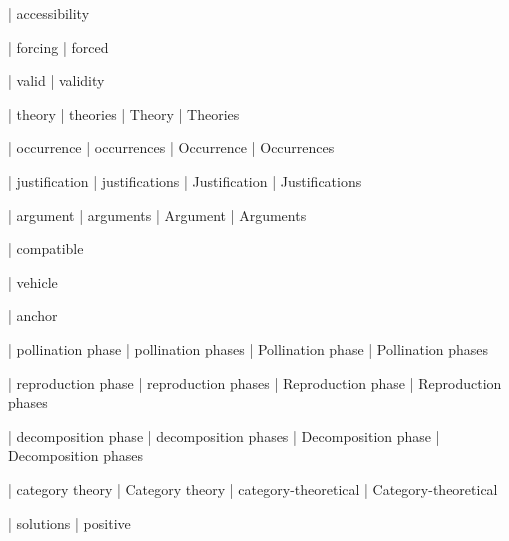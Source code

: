  | accessibility

 | forcing
 | forced

 | valid
 | validity

 | theory
 | theories
 | Theory
 | Theories
 
 | occurrence
 | occurrences
 | Occurrence
 | Occurrences

 | justification
 | justifications
 | Justification
 | Justifications

 | argument
 | arguments
 | Argument
 | Arguments

 | compatible

 | vehicle

 | anchor
 
 | pollination phase
 | pollination phases
 | Pollination phase
 | Pollination phases

 | reproduction phase
 | reproduction phases
 | Reproduction phase
 | Reproduction phases

 | decomposition phase
 | decomposition phases
 | Decomposition phase
 | Decomposition phases

\newcommand\fpmode[1]{\begingroup\textsc{#1}\endgroup}






 | category theory
 | Category theory
 | category-theoretical
 | Category-theoretical


 | solutions
 | positive
